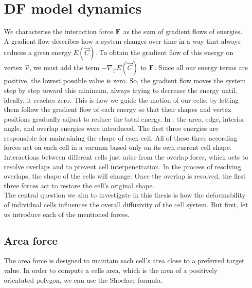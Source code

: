 \section{DF model dynamics} 
We characterise the interaction force $\mathbf{F}$ as the sum of gradient flows of energies. \\
A gradient flow describes how a system changes over time in a way that always reduces a given energy $E(\vec{C})$.
To obtain the gradient flow of this energy on vertex $\vec{v}$, we must add the term $-\nabla_{\vec{v}} E(\vec{C})$ to $\mathbf{F}$.
Since all our energy terms are positive, the lowest possible value is zero.  
So, the gradient flow moves the system step by step toward this minimum, always trying to decrease the energy until, ideally, it reaches zero. 
This is how we guide the motion of our cells: by letting them follow the gradient flow of each energy so that their shapes and vertex positions gradually adjust to reduce the total energy.
In \cite{Vogel2023}, the area, edge, interior angle, and overlap energies were introduced.
The first three energies are responsible for maintaining the shape of each cell. 
All of these three according forces act on each cell in a vacuum based only on its own current cell shape. \\
Interactions between different cells just arise from the overlap force, which acts to resolve overlaps and to prevent cell interpenetration. 
In the process of resolving overlaps, the shape of the cells will change.  
Once the overlap is resolved, the first three forces act to restore the cell's original shape. \\
The central question we aim to investigate in this thesis is how the deformability of individual cells influences the overall diffusivity of the cell system.
But first, let us introduce each of the mentioned forces. 

\subsection{Area force}
The area force is designed to maintain each cell's area close to a preferred target value. 
In order to compute a cells area, which is the area of a positively orientated polygon, we can use the Shoelace formula. 


